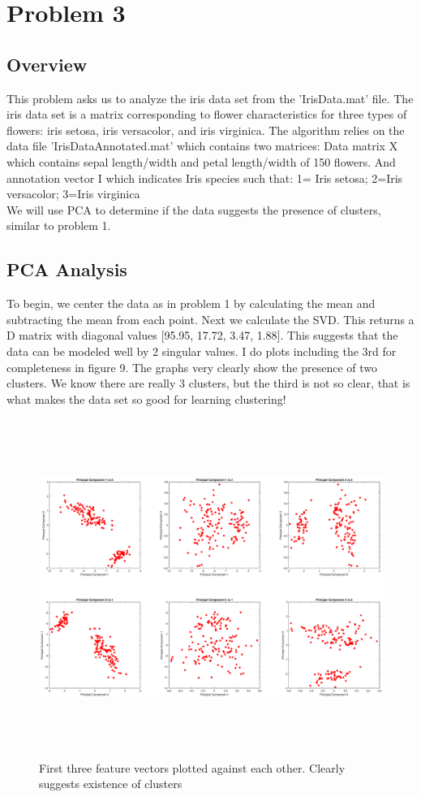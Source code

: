 \documentclass{article}
\begin{document}
\pagebreak
\section*{Problem 3}
\subsection*{Overview}
This problem asks us to analyze the iris data set from the 'IrisData.mat' file.  The iris data set is a matrix corresponding to flower characteristics for three types of flowers: iris setosa, iris versacolor, and iris virginica.  The algorithm relies on the data file 'IrisDataAnnotated.mat' which contains two matrices: Data matrix X which contains sepal length/width and petal length/width of 150 flowers.  And annotation vector I which indicates Iris species such that:
1= Iris setosa;     2=Iris versacolor;      3=Iris virginica\\
We will use PCA to determine if the data suggests the presence of clusters, similar to problem 1.  

\subsection*{PCA Analysis}
To begin, we center the data as in problem 1 by calculating the mean and subtracting the mean from each point.  Next we calculate the SVD. This returns a D matrix with diagonal values [95.95, 17.72, 3.47, 1.88].  This suggests that the data can be modeled well by 2 singular values.  I do plots including the 3rd for completeness in figure 9.  The graphs very clearly show the presence of two clusters. We know there are really 3 clusters, but the third is not so clear, that is what makes the data set so good for learning clustering!
    \begin{figure}[!h]
        \centerline
        {
        \includegraphics[width=15cm, height=11cm] {Q_3_3fv}
        }
        \caption{\label{fig:my figure} First three feature vectors plotted against each other. Clearly suggests existence of clusters}
    \end{figure}
\end{document}

